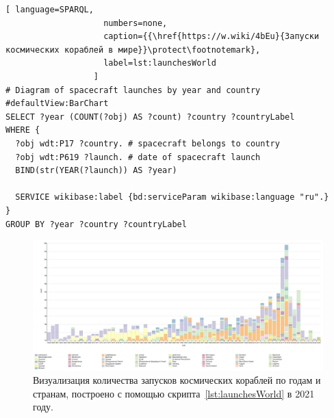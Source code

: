 \begin{lstlisting}[ language=SPARQL, 
                    numbers=none, 
                    caption={{\href{https://w.wiki/4bEu}{Запуски космических кораблей в мире}}\protect\footnotemark}, 
                    label=lst:launchesWorld
                  ]
# Diagram of spacecraft launches by year and country
#defaultView:BarChart
SELECT ?year (COUNT(?obj) AS ?count) ?country ?countryLabel
WHERE {
  ?obj wdt:P17 ?country. # spacecraft belongs to country 
  ?obj wdt:P619 ?launch. # date of spacecraft launch
  BIND(str(YEAR(?launch)) AS ?year)
  
  SERVICE wikibase:label {bd:serviceParam wikibase:language "ru".}
}
GROUP BY ?year ?country ?countryLabel
\end{lstlisting}
\label{question:spacecraft_2}

\begin{figure}[h!]
  \includegraphics[width=\linewidth]{graphics/chapter/spacecraft_space_station/Visualization of the number of spacecraft launches by year and country 2021.png}
  \caption[График запусков космических кораблей во всём мире по годам и странам]{Визуализация количества запусков космических кораблей по годам и странам, построено с помощью скрипта~\protect\ref{lst:launchesWorld} в 2021 году.}
  \label{fig:launchesWorld}%
\end{figure}

